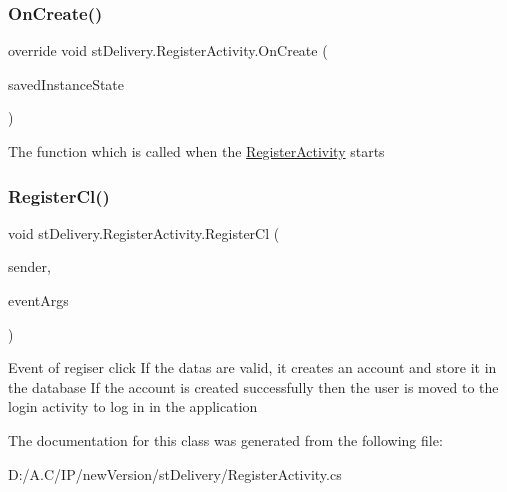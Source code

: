 \mbox{\label{classst_delivery_1_1_register_activity_a7ac56a2291110ac0f58c15a73636a535}} 
\subsubsection{\texorpdfstring{On\+Create()}{OnCreate()}}
{\footnotesize\ttfamily override void st\+Delivery.\+Register\+Activity.\+On\+Create (\begin{DoxyParamCaption}\item[{Bundle}]{saved\+Instance\+State }\end{DoxyParamCaption})\hspace{0.3cm}{\ttfamily [protected]}}



The function which is called when the \hyperlink{classst_delivery_1_1_register_activity}{Register\+Activity} starts 

\mbox{\label{classst_delivery_1_1_register_activity_a20eec67670bd72a456f0323ffb4b5b1c}} 
\subsubsection{\texorpdfstring{Register\+Cl()}{RegisterCl()}}
{\footnotesize\ttfamily void st\+Delivery.\+Register\+Activity.\+Register\+Cl (\begin{DoxyParamCaption}\item[{Object}]{sender,  }\item[{Event\+Args}]{event\+Args }\end{DoxyParamCaption})}



Event of regiser click If the datas are valid, it creates an account and store it in the database If the account is created successfully then the user is moved to the login activity to log in in the application 



The documentation for this class was generated from the following file\+:\begin{DoxyCompactItemize}
\item 
D\+:/\+A.\+C/\+I\+P/new\+Version/st\+Delivery/Register\+Activity.\+cs\end{DoxyCompactItemize}
